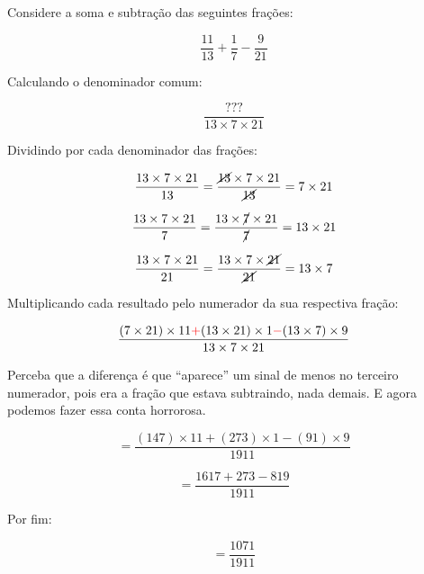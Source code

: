 \begin{exemplo}
    Considere a soma e subtração das seguintes frações:

    \begin{equation}
        \frac{11}{13}+\frac{1}{7}-\frac{9}{21}
    \end{equation}

    Calculando o denominador comum:

    \begin{equation}
        \frac{???}{13\times7\times21}
    \end{equation}

    Dividindo por cada denominador das frações:

    \begin{equation}
        \frac{13\times7\times21}{13}=\frac{\cancel{13}\times7\times21}{\cancel{13}} = 7\times21
    \end{equation}
    
    \begin{equation}
        \frac{13\times7\times21}{7} = \frac{13\times\cancel{7}\times21}{\cancel{7}} = 13\times21
    \end{equation}
    
    \begin{equation}
        \frac{13\times7\times21}{21} = \frac{13\times7\times\cancel{21}}{\cancel{21}} = 13\times 7
    \end{equation}

    Multiplicando cada resultado pelo numerador da sua respectiva fração:

    \begin{equation}
        \frac{(7\times21)\times11\textcolor{red}{+}(13\times21)\times1\textcolor{red}{-}(13\times 7)\times9}{13\times7\times21}
    \end{equation}

    Perceba que a diferença é que ``aparece'' um sinal de menos no terceiro numerador, pois era a fração que estava subtraindo, nada demais. E agora podemos fazer essa conta horrorosa.

    \begin{equation}
        =\frac{(147)\times11+(273)\times1-(91)\times9}{1911}
    \end{equation}
    
    \begin{equation}
        =\frac{1617+273-819}{1911}
    \end{equation}

    Por fim:
    
    \begin{equation}
        =\frac{1071}{1911}
    \end{equation}
\end{exemplo}

